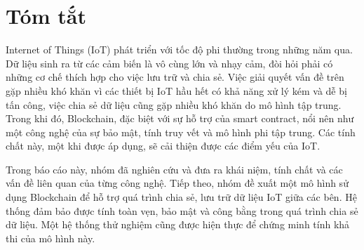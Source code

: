 \cleardoublepage
\chapter*{Tóm tắt}
\vspace{1.0cm}
Internet of Things (IoT) phát triển với tốc độ phi thường trong những năm qua. Dữ liệu sinh ra từ các cảm biến là vô cùng lớn và nhạy cảm, đòi hỏi phải có những cơ chế thích hợp cho việc lưu trữ và chia sẻ. Việc giải quyết vấn đề trên gặp nhiều khó khăn vì các thiết bị IoT hầu hết có khả năng xử lý kém và dễ bị tấn công, việc chia sẻ dữ liệu cũng gặp nhiều khó khăn do mô hình tập trung. Trong khi đó, Blockchain, đặc biệt với sự hỗ trợ của smart contract, nổi nên như một công nghệ của sự bảo mật, tính truy vết và mô hình phi tập trung. Các tính chất này, một khi được áp dụng, sẽ cải thiện được các điểm yếu của IoT.\par
Trong báo cáo này, nhóm đã nghiên cứu và đưa ra khái niệm, tính chất và các vấn đề liên quan của từng công nghệ. Tiếp theo, nhóm đề xuất một mô hình sử dụng Blockchain để hỗ trợ quá trình chia sẻ, lưu trữ dữ liệu IoT giữa các bên. Hệ thống đảm bảo được tính toàn vẹn, bảo mật và công bằng trong quá trình chia sẻ dữ liệu. Một hệ thống thử nghiệm cũng được hiện thực để chứng minh tính khả thi của mô hình này.
\vskip0.5cm
